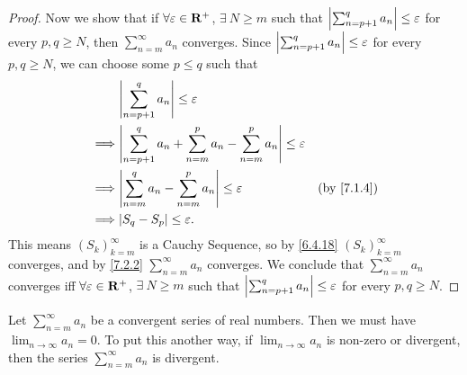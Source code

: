 \begin{proof}
  Now we show that if \(\forall \varepsilon \in \mathbf{R}^+\), \(\exists\ N \geq m\) such that \(\left\lvert\sum_{n = p + 1}^q a_n\right\rvert \leq \varepsilon\) for every \(p, q \geq N\), then \(\sum_{n = m}^\infty a_n\) converges.
  Since \(\left\lvert\sum_{n = p + 1}^q a_n\right\rvert \leq \varepsilon\) for every \(p, q \geq N\), we can choose some \(p \leq q\) such that
  \begin{align*}
             & \abs{\sum_{n = p + 1}^q a_n} \leq \varepsilon                                                                      \\
    \implies & \abs{\sum_{n = p + 1}^q a_n + \sum_{n = m}^p a_n - \sum_{n = m}^p a_n} \leq \varepsilon                            \\
    \implies & \abs{\sum_{n = m}^q a_n - \sum_{n = m}^p a_n} \leq \varepsilon                          & \text{(by \cref{7.1.4})} \\
    \implies & \abs{S_q - S_p} \leq \varepsilon.
  \end{align*}
  This means \((S_k)_{k = m}^\infty\) is a Cauchy Sequence, so by \cref{6.4.18} \((S_k)_{k = m}^\infty\) converges, and by \cref{7.2.2} \(\sum_{n = m}^\infty a_n\) converges.
  We conclude that \(\sum_{n = m}^\infty a_n\) converges iff \(\forall \varepsilon \in \mathbf{R}^+\), \(\exists\ N \geq m\) such that \(\left\lvert\sum_{n = p + 1}^q a_n\right\rvert \leq \varepsilon\) for every \(p, q \geq N\).
\end{proof}

\begin{corollary}\label{7.2.6}
  Let \(\sum_{n = m}^\infty a_n\) be a convergent series of real numbers.
  Then we must have \(\lim_{n \to \infty} a_n = 0\).
  To put this another way, if \(\lim_{n \to \infty} a_n\) is non-zero or divergent, then the series \(\sum_{n = m}^\infty a_n\) is divergent.
\end{corollary}

